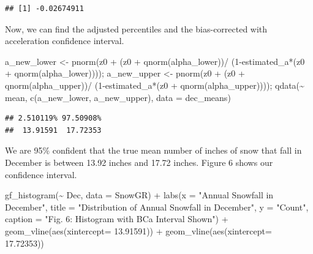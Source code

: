 \documentclass[12pt]{article}
\newenvironment{Shaded}{\begin{snugshade}}{\end{snugshade}}
\newcommand{\AttributeTok}[1]{\textcolor[rgb]{0.77,0.63,0.00}{#1}}
\newcommand{\DecValTok}[1]{\textcolor[rgb]{0.00,0.00,0.81}{#1}}
\newcommand{\FloatTok}[1]{\textcolor[rgb]{0.00,0.00,0.81}{#1}}
\newcommand{\FunctionTok}[1]{\textcolor[rgb]{0.00,0.00,0.00}{#1}}
\newcommand{\NormalTok}[1]{#1}
\newcommand{\OtherTok}[1]{\textcolor[rgb]{0.56,0.35,0.01}{#1}}
\newcommand{\SpecialCharTok}[1]{\textcolor[rgb]{0.00,0.00,0.00}{#1}}
\newcommand{\StringTok}[1]{\textcolor[rgb]{0.31,0.60,0.02}{#1}}
\begin{document}
\begin{verbatim}
## [1] -0.02674911
\end{verbatim}

Now, we can find the adjusted percentiles and the bias-corrected with
acceleration confidence interval.

\begin{Shaded}
\begin{Highlighting}[]
\NormalTok{a\_new\_lower }\OtherTok{\textless{}{-}} \FunctionTok{pnorm}\NormalTok{(z0 }\SpecialCharTok{+}\NormalTok{ (z0 }\SpecialCharTok{+} \FunctionTok{qnorm}\NormalTok{(alpha\_lower))}\SpecialCharTok{/}
\NormalTok{                    (}\DecValTok{1}\SpecialCharTok{{-}}\NormalTok{estimated\_a}\SpecialCharTok{*}\NormalTok{(z0 }\SpecialCharTok{+} \FunctionTok{qnorm}\NormalTok{(alpha\_lower)))); }
\NormalTok{a\_new\_upper }\OtherTok{\textless{}{-}} \FunctionTok{pnorm}\NormalTok{(z0 }\SpecialCharTok{+}\NormalTok{ (z0 }\SpecialCharTok{+} \FunctionTok{qnorm}\NormalTok{(alpha\_upper))}\SpecialCharTok{/}
\NormalTok{                     (}\DecValTok{1}\SpecialCharTok{{-}}\NormalTok{estimated\_a}\SpecialCharTok{*}\NormalTok{(z0 }\SpecialCharTok{+} \FunctionTok{qnorm}\NormalTok{(alpha\_upper)))); }
\FunctionTok{qdata}\NormalTok{(}\SpecialCharTok{\textasciitilde{}}\NormalTok{ mean, }\FunctionTok{c}\NormalTok{(a\_new\_lower, a\_new\_upper), }\AttributeTok{data =}\NormalTok{ dec\_means)}
\end{Highlighting}
\end{Shaded}

\begin{verbatim}
## 2.510119% 97.50908% 
##  13.91591  17.72353
\end{verbatim}

We are 95\% confident that the true mean number of inches of snow that
fall in December is between 13.92 inches and 17.72 inches. Figure 6
shows our confidence interval.

\begin{Shaded}
\begin{Highlighting}[]
\FunctionTok{gf\_histogram}\NormalTok{(}\SpecialCharTok{\textasciitilde{}}\NormalTok{ Dec, }\AttributeTok{data =}\NormalTok{ SnowGR) }\SpecialCharTok{+}
  \FunctionTok{labs}\NormalTok{(}\AttributeTok{x =} \StringTok{"Annual Snowfall in December"}\NormalTok{, }
       \AttributeTok{title =} \StringTok{"Distribution of Annual Snowfall in December"}\NormalTok{, }\AttributeTok{y =} \StringTok{"Count"}\NormalTok{,}
       \AttributeTok{caption =} \StringTok{"Fig. 6: Histogram with BCa Interval Shown"}\NormalTok{) }\SpecialCharTok{+}
  \FunctionTok{geom\_vline}\NormalTok{(}\FunctionTok{aes}\NormalTok{(}\AttributeTok{xintercept=} \FloatTok{13.91591}\NormalTok{)) }\SpecialCharTok{+}
  \FunctionTok{geom\_vline}\NormalTok{(}\FunctionTok{aes}\NormalTok{(}\AttributeTok{xintercept=} \FloatTok{17.72353}\NormalTok{))}
\end{Highlighting}
\end{Shaded}
\end{document}
